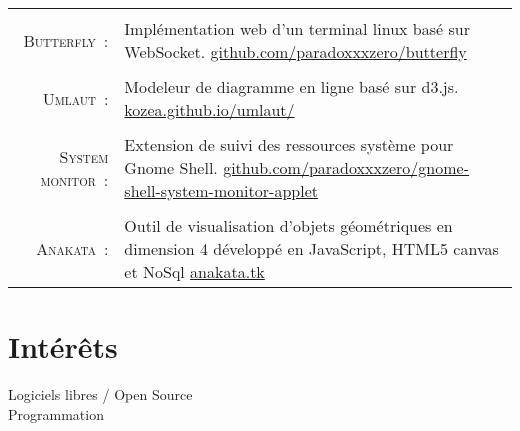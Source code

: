 \documentclass[a4paper,10pt]{article}
\begin{document}
\begin{tabular}{r|p{11cm}}
  \multicolumn{2}{c}{} \\
  \textsc{Butterfly :} &  Implémentation web d'un terminal linux basé sur WebSocket. \href{https://github.com/paradoxxxzero/butterfly}{github.com/paradoxxxzero/butterfly}\\

  \multicolumn{2}{c}{} \\
  \textsc{Umlaut :} & Modeleur de diagramme en ligne basé sur d3.js. \href{http://kozea.github.io/umlaut/}{kozea.github.io/umlaut/} \\

  \multicolumn{2}{c}{} \\
  \textsc{System monitor :} & Extension de suivi des ressources système pour Gnome Shell. \href{https://github.com/paradoxxxzero/gnome-shell-system-monitor-applet}{github.com/paradoxxxzero/gnome-shell-system-monitor-applet} \\

  \multicolumn{2}{c}{} \\
  \textsc{Anakata :} & Outil de visualisation d’objets géométriques en dimension 4 développé en JavaScript, HTML5 canvas et NoSql \href{http://anakata.tk}{anakata.tk} \\

\end{tabular}

\section{Intérêts}
Logiciels libres / Open Source \\
Programmation
\end{document}
